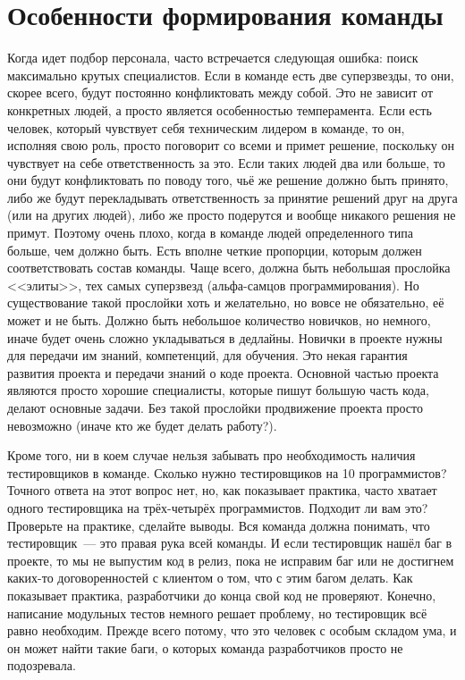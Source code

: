 \documentclass{../../text-style}
\begin{document}
\section{Особенности формирования команды}

Когда идет подбор персонала, часто встречается следующая ошибка: поиск максимально крутых специалистов. Если в команде есть две суперзвезды, то они, скорее всего, будут постоянно конфликтовать между собой. Это не зависит от конкретных людей, а просто является особенностью темперамента. Если есть человек, который чувствует себя техническим лидером в команде, то он, исполняя свою роль, просто поговорит со всеми и примет решение, поскольку он чувствует на себе ответственность за это. Если таких людей два или больше, то они будут конфликтовать по поводу того, чьё же решение должно быть принято, либо же будут перекладывать ответственность за принятие решений друг на друга (или на других людей), либо же просто подерутся и вообще никакого решения не примут. Поэтому очень плохо, когда в команде людей определенного типа больше, чем должно быть. Есть вполне четкие пропорции, которым должен соответствовать состав команды. Чаще всего, должна быть небольшая прослойка <<элиты>>, тех самых суперзвезд (альфа-самцов программирования). Но существование такой прослойки хоть и желательно, но вовсе не обязательно, её может и не быть. Должно быть небольшое количество новичков, но немного, иначе будет очень сложно укладываться в дедлайны. Новички в проекте нужны для передачи им знаний, компетенций, для обучения. Это некая гарантия развития проекта и передачи знаний о коде проекта. Основной частью проекта являются просто хорошие специалисты, которые пишут большую часть кода, делают основные задачи. Без такой прослойки продвижение проекта просто невозможно (иначе кто же будет делать работу?).

Кроме того, ни в коем случае нельзя забывать про необходимость наличия тестировщиков в команде. Сколько нужно тестировщиков на 10 программистов? Точного ответа на этот вопрос нет, но, как показывает практика, часто хватает одного тестировщика на трёх-четырёх программистов. Подходит ли вам это? Проверьте на практике, сделайте выводы. Вся команда должна понимать, что тестировщик~--- это правая рука всей команды. И если тестировщик нашёл баг в проекте, то мы не выпустим код в релиз, пока не исправим баг или не достигнем каких-то договоренностей с клиентом о том, что с этим багом делать. Как показывает практика, разработчики до конца свой код не проверяют. Конечно, написание модульных тестов немного решает проблему, но тестировщик всё равно необходим. Прежде всего потому, что это человек с особым складом ума, и он может найти такие баги, о которых команда разработчиков просто не подозревала.
\end{document}

